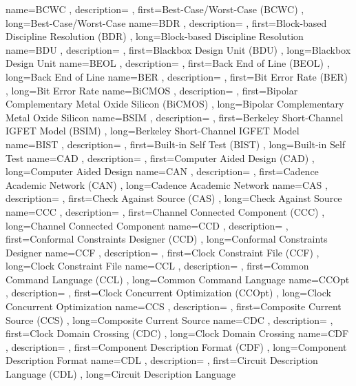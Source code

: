 { name={BCWC}
, description={}
, first={Best-Case/Worst-Case (BCWC)}
, long={Best-Case/Worst-Case}
}
{ name={BDR}
, description={}
, first={Block-based Discipline Resolution (BDR)}
, long={Block-based Discipline Resolution}
}
{ name={BDU}
, description={}
, first={Blackbox Design Unit (BDU)}
, long={Blackbox Design Unit}
}
{ name={BEOL}
, description={}
, first={Back End of Line (BEOL)}
, long={Back End of Line}
}
{ name={BER}
, description={}
, first={Bit Error Rate (BER)}
, long={Bit Error Rate}
}
{ name={BiCMOS}
, description={}
, first={Bipolar Complementary Metal Oxide Silicon (BiCMOS)}
, long={Bipolar Complementary Metal Oxide Silicon}
}
{ name={BSIM}
, description={}
, first={Berkeley Short-Channel IGFET Model (BSIM)}
, long={Berkeley Short-Channel IGFET Model}
}
{ name={BIST}
, description={}
, first={Built-in Self Test (BIST)}
, long={Built-in Self Test}
}
{ name={CAD}
, description={}
, first={Computer Aided Design (CAD)}
, long={Computer Aided Design}
}
{ name={CAN}
, description={}
, first={Cadence Academic Network (CAN)}
, long={Cadence Academic Network}
}
{ name={CAS}
, description={}
, first={Check Against Source (CAS)}
, long={Check Against Source}
}
{ name={CCC}
, description={}
, first={Channel Connected Component (CCC)}
, long={Channel Connected Component}
}
{ name={CCD}
, description={}
, first={Conformal Constraints Designer (CCD)}
, long={Conformal Constraints Designer}
}
{ name={CCF}
, description={}
, first={Clock Constraint File (CCF)}
, long={Clock Constraint File}
}
{ name={CCL}
, description={}
, first={Common Command Language (CCL)}
, long={Common Command Language}
}
{ name={CCOpt}
, description={}
, first={Clock Concurrent Optimization (CCOpt)}
, long={Clock Concurrent Optimization}
}
{ name={CCS}
, description={}
, first={Composite Current Source (CCS)}
, long={Composite Current Source}
}
{ name={CDC}
, description={}
, first={Clock Domain Crossing (CDC)}
, long={Clock Domain Crossing}
}
{ name={CDF}
, description={}
, first={Component Description Format (CDF)}
, long={Component Description Format}
}
{ name={CDL}
, description={}
, first={Circuit Description Language (CDL)}
, long={Circuit Description Language}
}
